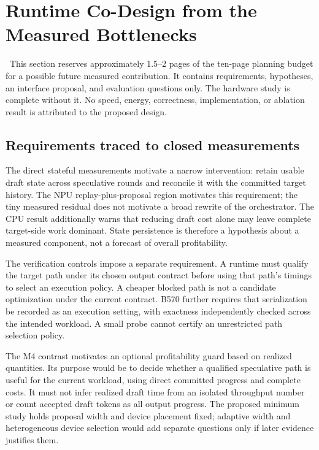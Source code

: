 \section{Runtime Co-Design from the Measured Bottlenecks}
\label{sec:runtime}
\pending\ This section reserves approximately 1.5--2 pages of the ten-page planning budget for a possible future measured contribution. It contains requirements, hypotheses, an interface proposal, and evaluation questions only. The hardware study is complete without it. No speed, energy, correctness, implementation, or ablation result is attributed to the proposed design.

\subsection{Requirements traced to closed measurements}
The direct stateful measurements motivate a narrow intervention: retain usable draft state across speculative rounds and reconcile it with the committed target history. The NPU replay-plus-proposal region motivates this requirement; the tiny measured residual does not motivate a broad rewrite of the orchestrator. The CPU result additionally warns that reducing draft cost alone may leave complete target-side work dominant. State persistence is therefore a hypothesis about a measured component, not a forecast of overall profitability.

The verification controls impose a separate requirement. A runtime must qualify the target path under its chosen output contract before using that path's timings to select an execution policy. A cheaper blocked path is not a candidate optimization under the current contract. B570 further requires that serialization be recorded as an execution setting, with exactness independently checked across the intended workload. A small probe cannot certify an unrestricted path selection policy.

The M4 contrast motivates an optional profitability guard based on realized quantities. Its purpose would be to decide whether a qualified speculative path is useful for the current workload, using direct committed progress and complete costs. It must not infer realized draft time from an isolated throughput number or count accepted draft tokens as all output progress. The proposed minimum study holds proposal width and device placement fixed; adaptive width and heterogeneous device selection would add separate questions only if later evidence justifies them.

